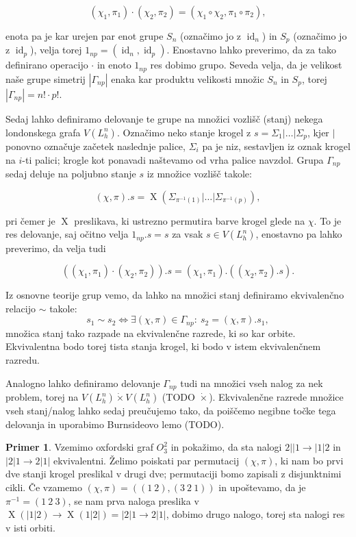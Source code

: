 \documentclass[12pt,a4paper]{amsart}
\theoremstyle{definition} %
\newtheorem{primer}[definicija]{Primer}
\theoremstyle{plain} %
\DeclareMathOperator {\id} {id}
\DeclareMathOperator {\X}{X}
\begin{document}
\[ (\chi_1,\pi_1) \cdot (\chi_2,\pi_2) = (\chi_1 \circ \chi_2,\pi_1 \circ \pi_2), \]

enota pa je kar urejen par enot grupe $S_n$ (označimo jo z $\id_n$) in $S_p$ (označimo jo z $\id_p$), velja torej $1_{np} = (\id_n, \id_p) $. Enostavno lahko preverimo, da za tako definirano operacijo $\cdot$ in enoto $1_{np}$ res dobimo grupo. Seveda velja, da je velikost naše grupe simetrij $|\Gamma_{np}|$ enaka kar produktu velikosti množic $S_n$ in $S_p$, torej $|\Gamma_{np}| = n! \cdot p!$. 

Sedaj lahko definiramo delovanje te grupe na množici vozlišč (stanj) nekega londonskega grafa $V(L_h^n)$. Označimo neko stanje krogel z $s = \Sigma_1 | \ldots | \Sigma_p$, kjer $|$ ponovno označuje začetek naslednje palice, $\Sigma_i$ pa je niz, sestavljen iz oznak krogel na $i$-ti palici; krogle kot ponavadi naštevamo od vrha palice navzdol. Grupa $\Gamma_{np}$ sedaj deluje na poljubno stanje $s$ iz množice vozlišč takole:

\[ (\chi,\pi) . s = \X \left( \Sigma_{\pi^{-1}(1)} | \ldots | \Sigma_{\pi^{-1}(p)} \right), \]

pri čemer je $\X$ preslikava, ki ustrezno permutira barve krogel glede na $\chi$. To je res delovanje, saj očitno velja $1_{np}.s = s$ za vsak $s \in V(L_h^n)$, enostavno pa lahko preverimo, da velja tudi

\[ \left((\chi_1,\pi_1) \cdot (\chi_2,\pi_2)\right).s = (\chi_1,\pi_1) . ((\chi_2,\pi_2).s) .\]

Iz osnovne teorije grup vemo, da lahko na množici stanj definiramo ekvivalenčno relacijo $\sim$ takole:
\[ s_1 \sim s_2 \iff \exists (\chi,\pi) \in \Gamma_{np}\colon \ s_2 = (\chi,\pi).s_1, \]
množica stanj tako razpade na ekvivalenčne razrede, ki so kar orbite. Ekvivalentna bodo torej tista stanja krogel, ki bodo v istem ekvivalenčnem razredu.

Analogno lahko definiramo delovanje $\Gamma_{np}$ tudi na množici vseh nalog za nek problem, torej na $V(L^n_h) \dot{\times} V(L^n_h)$ (TODO $\dot{\times}$). Ekvivalenčne razrede množice vseh stanj/nalog lahko sedaj preučujemo tako, da poiščemo negibne točke tega delovanja in uporabimo Burnsideovo lemo (TODO).

\begin{primer}
    Vzemimo oxfordski graf $O^2_3$ in pokažimo, da sta nalogi $2||1 \rightarrow |1|2$ in $|2|1 \rightarrow 2|1|$ ekvivalentni. Želimo poiskati par permutacij $(\chi, \pi)$, ki nam bo prvi dve stanji krogel preslikal v drugi dve; permutaciji bomo zapisali z disjunktnimi cikli. Če vzamemo $(\chi, \pi) = ((1\ 2), (3\ 2\ 1))$ in upoštevamo, da je $\pi^{-1}=(1\ 2\ 3)$, se nam prva naloga preslika v $\X(|1|2) \rightarrow \X(1|2|) = |2|1 \rightarrow 2|1|$, dobimo drugo nalogo, torej sta nalogi res v isti orbiti.
\end{primer}
\end{document}
